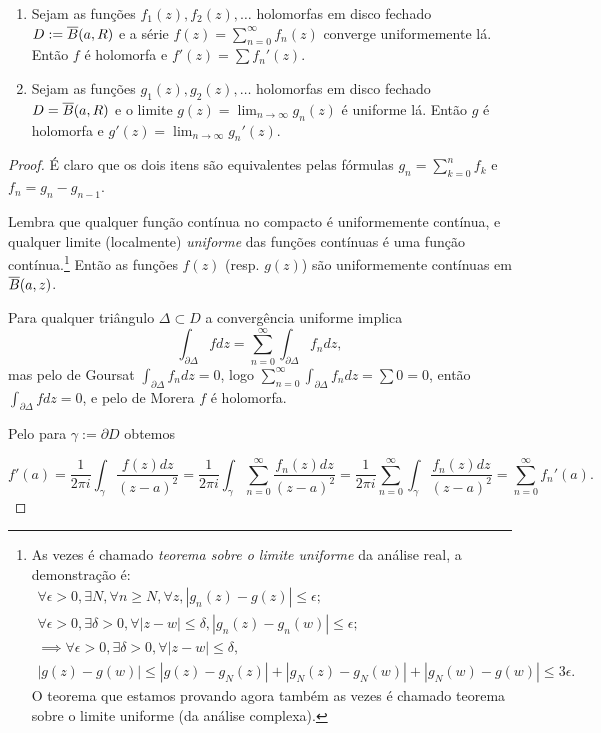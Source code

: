 \begin{lema}
\label{l:uniforme}
\begin{enumerate}
\item
Sejam as funções $f_1(z),f_2(z),\dots$ holomorfas em disco fechado
$D := \overline{B}(a,R)$ e a série $f(z) = \sum_{n=0}^\infty f_n(z)$ converge uniformemente lá.
Então $f$ é holomorfa e $f'(z) = \sum f_n'(z)$.
\item
Sejam as funções $g_1(z),g_2(z),\dots$ holomorfas em disco fechado
$D = \overline{B}(a,R)$ e o limite $g(z) = \lim_{n\to\infty} g_n(z)$ é uniforme lá.
Então $g$ é holomorfa e $g'(z) = \lim_{n\to\infty} g_n'(z)$.
\end{enumerate}
\end{lema}
\begin{proof}
É claro que os dois itens são equivalentes pelas fórmulas
$g_n = \sum_{k=0}^n f_k$ e $f_n = g_n - g_{n-1}$.

Lembra que qualquer função contínua no compacto é uniformemente contínua,
e qualquer limite (localmente) \emph{uniforme} das funções contínuas
é uma função contínua.\footnote{
As vezes é chamado \emph{teorema sobre o limite uniforme} da análise real, a demonstração é:
\begin{align*}
\forall \epsilon>0, \exists N, \forall n\geq N, \forall z, |g_n(z)-g(z)|\leq\epsilon; \\
\forall \epsilon>0, \exists \delta>0, \forall |z-w|\leq\delta, |g_n(z)-g_n(w)|\leq\epsilon; \\
\implies \forall \epsilon>0, \exists \delta>0, \forall |z-w|\leq\delta, \\
|g(z)-g(w)|\leq |g(z)-g_N(z)| + |g_N(z)-g_N(w)| + |g_N(w)-g(w)| \leq 3\epsilon.
\end{align*}
O teorema que estamos provando agora também as vezes é chamado
teorema sobre o limite uniforme (da análise complexa).  }
Então as funções $f(z)$ (resp. $g(z)$) são uniformemente contínuas em $\overline{B}(a,z)$.

Para qualquer triângulo $\Delta \subset D$ a convergência uniforme implica
\[ \int_{\partial \Delta} f dz = \sum_{n=0}^\infty \int_{\partial \Delta} f_n dz, \]
mas pelo  de Goursat $\int_{\partial \Delta} f_n dz = 0$,
logo $\sum_{n=0}^\infty \int_{\partial \Delta} f_n dz = \sum 0 = 0$,
então $\int_{\partial \Delta} f dz = 0$,
e pelo  de Morera $f$ é holomorfa.

Pelo  para $\gamma := \partial D$ obtemos

\[ f'(a) = \frac1{2\pi i} \int_{\gamma} \frac{f(z)dz}{(z-a)^2}
= \frac1{2\pi i} \int_{\gamma} \sum_{n=0}^\infty \frac{f_n(z)dz}{(z-a)^2}
= \frac1{2\pi i} \sum_{n=0}^\infty \int_{\gamma} \frac{f_n(z)dz}{(z-a)^2}
= \sum_{n=0}^\infty f_n'(a). \]
\end{proof}

